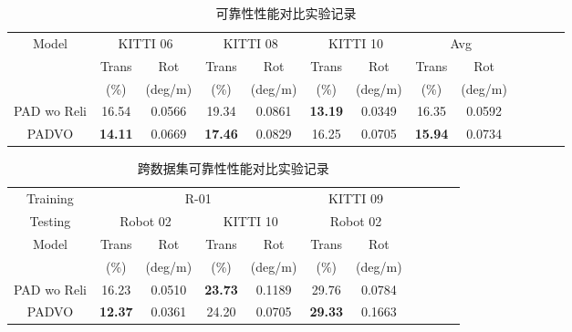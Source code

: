 \begin{table*}[h]
    \caption{可靠性性能对比实验记录}
    \begin{center}
    \begin{tabular}{c c c c c c c c c c c c c }
    \toprule
    \multirow{3}{*}{Model}  &\multicolumn{2}{c}{KITTI 06} &\multicolumn{2}{c}{KITTI 08} & \multicolumn{2}{c}{KITTI 10}& \multicolumn{2}{c}{Avg}\\
    \cline{2-3}  \cline{4-5}  \cline{6-7} \cline{8-9} 
    & Trans & Rot  & Trans & Rot &Trans & Rot& Trans & Rot\\ 
    & (\%) & (deg/m)  & (\%) & (deg/m)& (\%) & (deg/m) & (\%) & (deg/m)\\
    \midrule
     PAD wo Reli &16.54&0.0566&19.34&0.0861&\textbf{13.19}&0.0349&16.35& 0.0592\\
     PADVO       &\textbf{14.11}& 0.0669&\textbf{17.46}& 0.0829&16.25& 0.0705&\textbf{15.94}&0.0734\\
    \bottomrule
    \end{tabular}
    \end{center}
    \label{tab:padvo_reli_compare_1}
    \end{table*}
    
    \begin{table*}[h]
      \caption{跨数据集可靠性性能对比实验记录}
      \begin{center}
      \begin{tabular}{c c c c c c c c c c c }
      \toprule
    Training &\multicolumn{4}{c}{R-01} &\multicolumn{2}{c}{KITTI 09} \\
    \cline{2-7}
    Testing  &\multicolumn{2}{c}{Robot 02} &\multicolumn{2}{c}{KITTI 10} & \multicolumn{2}{c}{Robot 02}\\
      \cline{1-3}  \cline{4-5}  \cline{6-7} \cline{8-9} 
      \multirow{2}{*}{Model}  & Trans & Rot  & Trans & Rot &Trans & Rot\\ 
      & (\%) & (deg/m)  & (\%) & (deg/m)& (\%) & (deg/m) \\
      \midrule
       PAD wo Reli &16.23&0.0510&\textbf{23.73}&0.1189&29.76&0.0784 \\
       PADVO       &\textbf{12.37}& 0.0361&24.20& 0.0705&\textbf{29.33}& 0.1663\\
      \bottomrule
      \end{tabular}
      \end{center}
      \label{tab:padvo_reli_compare_2}
      \end{table*}
    
